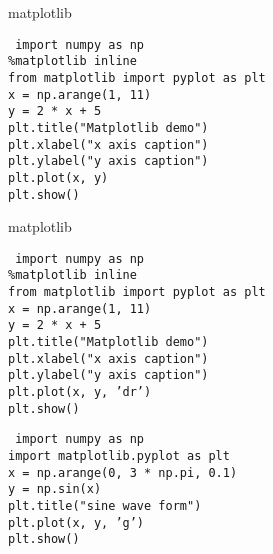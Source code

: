 \begin{frame}{matplotlib}

  {\tt
    import numpy as np \\
    \%matplotlib inline     {} \\
    from matplotlib import pyplot as plt \\[4mm]
    x = np.arange(1, 11) \\
    y = 2 * x + 5 \\
    plt.title("Matplotlib demo") \\
    plt.xlabel("x axis caption") \\
    plt.ylabel("y axis caption") \\
    plt.plot(x, y) \\
    plt.show()
  }
\end{frame}

\begin{frame}{matplotlib}

  {\tt
    import numpy as np \\
    \%matplotlib inline     {} \\
    from matplotlib import pyplot as plt \\[4mm]
    x = np.arange(1, 11) \\
    y = 2 * x + 5 \\
    plt.title("Matplotlib demo") \\
    plt.xlabel("x axis caption") \\
    plt.ylabel("y axis caption") \\
    plt.plot(x, y, 'dr') \\
    plt.show()
  }
\end{frame}

\begin{frame}{}

  {\tt
    import numpy as np \\
    import matplotlib.pyplot as plt  \\[4mm]
    x = np.arange(0, 3 * np.pi, 0.1) \\
    y = np.sin(x) \\
    plt.title("sine wave form") \\
    plt.plot(x, y, 'g') \\
    plt.show() 
  }
\end{frame}

